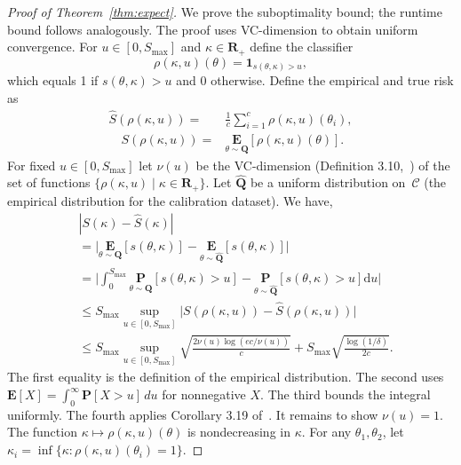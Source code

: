 \documentclass[12pt]{article}
\renewcommand{\cite}[1]{\citep{#1}}
\theoremstyle{definition}
\theoremstyle{remark}
\newcommand{\paramdist}{\mathbf{Q}}
\newcommand{\param}{\theta}
\newcommand{\reals}{\mathbf{R}}
\newcommand{\Prob}{\mathbf{P}}
\newcommand{\E}{\mathbf{E}}
\newcommand{\calibration}{\mathcal{C}}
\newcommand{\termov}{s}
\newcommand{\lt}{\kappa}
\newcommand{\zbd}{{S_{\text{max}}}}
\newcommand{\classif}{\rho}
\newcommand{\vc}{\nu}
\newcommand{\indicator}{\mathbf{1}}
\newcommand{\ncalib}{c}
\newcommand{\paramdist}{\mathbf{Q}}
\newcommand{\param}{\theta}
\newcommand{\reals}{\mathbf{R}}
\newcommand{\Prob}{\mathbf{P}}
\newcommand{\E}{\mathbf{E}}
\newcommand{\calibration}{\mathcal{C}}
\newcommand{\termov}{s}
\newcommand{\lt}{\kappa}
\newcommand{\zbd}{{S_{\text{max}}}}
\newcommand{\classif}{\rho}
\newcommand{\vc}{\nu}
\newcommand{\indicator}{\mathbf{1}}
\newcommand{\ncalib}{c}
\theoremstyle{plain}
\theoremstyle{definition}
\theoremstyle{remark}
\begin{document}
\begin{proof}[Proof of Theorem~\ref{thm:expect}]
    We prove the suboptimality bound; the runtime bound follows analogously.
    The proof uses VC-dimension to obtain uniform convergence.
    For $u \in [0, \zbd]$ and $\lt \in \reals_+$ define the classifier
    \begin{equation*}
        \classif(\lt,u)(\param) = \indicator_{\termov(\param, \lt) > u},
    \end{equation*}
    which equals 1 if $\termov(\param, \lt) > u$ and 0 otherwise.
    Define the empirical and true risk as
    \begin{align*}
        \hat{S}(\classif(\lt, u)) =& \frac{1}{\ncalib}\sum_{i=1}^\ncalib \classif(\lt,u)(\param_i), \\ \quad S(\classif(\lt, u)) =& \underset{\param \sim \paramdist}{\E}[ \classif(\lt,u)(\param)].
    \end{align*}
    For fixed $u \in [0, \zbd]$ let $\vc(u)$ be the VC-dimension (Definition 3.10,~\cite{Mohri2012FoundationsOM}) of the set of functions $\{\classif(\lt, u) \mid \lt \in \reals_+\}$.
    Let $\hat{\paramdist}$ be a uniform distribution on~$\calibration$ (the empirical distribution for the calibration dataset).
    We have,
    \begin{align*}
        & |S(\lt) - \hat{S}(\lt)| \\ &= \Big|\underset{\param \sim \paramdist}{\E}[\termov(\param, \lt)] - \underset{\param \sim \hat{\paramdist}}{\E}[\termov(\param, \lt)]\Big| \\
        &= \Bigg| \int_{0}^\zbd \underset{\param \sim \paramdist}{\Prob}[\termov(\param, \lt)>u] - \underset{\param \sim \hat{\paramdist}}{\Prob}[\termov(\param, \lt)>u] \text{d}u \Bigg| \\
        &\le\zbd  \underset{u \in [0, \zbd]}{\sup} \big| S(\classif(\lt, u)) - \hat{S}(\classif(\lt, u)) \big| \\
        & \le \zbd \underset{u \in [0, \zbd]}{\sup}\sqrt{\frac{2 \vc(u) \log(e \ncalib /\vc(u))}{\ncalib}} + \zbd \sqrt{\frac{\log(1/\delta)}{2\ncalib}}.
    \end{align*}
    The first equality is the definition of the empirical distribution.
    The second uses $\E[X] = \int_0^\infty \Prob[X > u] \, du$ for nonnegative $X$.
    The third bounds the integral uniformly.
    The fourth applies Corollary 3.19 of~\citet{Mohri2012FoundationsOM}.
    It remains to show $\vc(u) = 1$.
    The function $\lt \mapsto \classif(\lt, u)(\param)$ is nondecreasing in $\lt$.
    For any $\param_1, \param_2$, let $\lt_i = \inf\{\lt : \classif(\lt, u)(\param_i) = 1\}$.

\end{proof}
\end{document}
